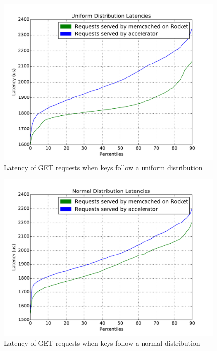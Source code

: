 \begin{figure}[t]
\begin{center}
\includegraphics[width=\linewidth]{unif.pdf}
\caption{Latency of GET requests when keys follow a uniform distribution}
\label{fig:unif}
\end{center}
\end{figure}

\begin{figure}[t]
\begin{center}
\includegraphics[width=\linewidth]{norm.pdf}
\caption{Latency of GET requests when keys follow a normal distribution}
\label{fig:norm}
\end{center}
\end{figure}

